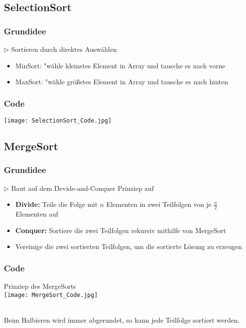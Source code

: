 		
	\subsection{SelectionSort}
		\subsubsection{Grundidee}
			$\rhd$ Sortieren durch direktes Auswählen
				
			\begin{itemize}
				\item MinSort: "wähle kleinstes Element in Array und tausche es nach vorne
				\item MaxSort: "wähle grö\ss etes Element in Array und tausche es nach hinten
			\end{itemize}
				
		\subsubsection{Code}
			\begin{center}
				\texttt{[image: SelectionSort\_Code.jpg]}
			\end{center}
			\vspace{1.5cm}
		
		
	\subsection{MergeSort}
		\label{MergeSort}
		
		\subsubsection{Grundidee}
			$\rhd$ Baut auf dem Devide-and-Conquer Prinziep auf
			\begin{itemize}
				\item \textbf{Divide:} Teile die Folge mit $n$ Elementen in zwei Teilfolgen von je $\frac{n}{2}$ Elementen auf
				\item \textbf{Conquer:} Sortiere die zwei Teilfolgen rekursiv mithilfe von MergeSort
				\item Vereinige die zwei sortierten Teilfolgen, um die sortierte Lösung zu erzeugen
			\end{itemize}
				
				
		\subsubsection{Code}
			\begin{center}
				Prinziep des MergeSorts \\
				\texttt{[image: MergeSort\_Code.jpg]}
			\end{center}
			\mbox{} \\
			Beim Halbieren wird immer abgerundet, so kann jede Teilfolge sortiert werden. \\ \\
				
